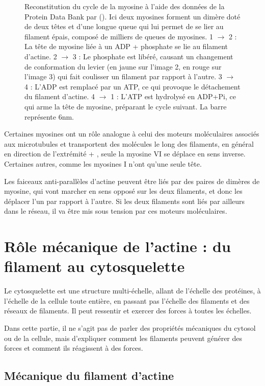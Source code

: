 \documentclass{report}
\begin{document}
\begin{figure}
\caption{Reconstitution du cycle de la myosine à l'aide des données de la Protein Data Bank par (\cite{vale_way_2000}). Ici deux myosines forment un dimère doté de deux têtes et d'une longue queue qui lui permet de se lier au filament épais, composé de milliers de queues de myosines.  1 $\rightarrow$ 2 : La tête de myosine liée à un ADP + phosphate se lie au filament d'actine. 2 $\rightarrow$ 3 : Le phosphate est libéré, causant un changement de conformation du levier (en jaune sur l'image 2, en rouge sur l'image 3) qui fait coulisser un filament par rapport à l'autre. 3 $\rightarrow$ 4 : L'ADP est remplacé par un ATP, ce qui provoque le détachement du filament d'actine. 4 $\rightarrow$ 1 : L'ATP est hydrolysé en ADP+Pi, ce qui arme la tête de myosine, préparant le cycle suivant. La barre représente 6nm. \label{myosin_cycle}}
\end{figure} 



Certaines myosines ont un rôle analogue à celui des moteurs moléculaires associés aux microtubules et transportent des molécules le long des filaments, en général en direction de l'extrémité + , seule la myosine VI se déplace en sens inverse. Certaines autres, comme les myosines I n'ont qu'une seule tête. 


Les faiceaux anti-parallèles d'actine peuvent être liés par des paires de dimères de myosine, qui vont marcher en sens opposé sur les deux filaments, et donc les déplacer l'un par rapport à l'autre. Si les deux filaments sont liés par ailleurs dans le réseau, il va être mis sous tension par ces moteurs moléculaires. 




\section{Rôle mécanique de l'actine : du filament au cytosquelette}

Le cytosquelette est une structure multi-échelle, allant de l'échelle des protéines, à l'échelle de la cellule toute entière, en passant pas l'échelle des filaments et des réseaux de filaments. Il peut ressentir et exercer des forces à toutes les échelles. 


Dans cette partie, il ne s'agit pas de parler des propriétés mécaniques du cytosol ou de la cellule, mais d'expliquer comment les filaments peuvent générer des forces et comment ils réagissent à des forces. 

\subsection{Mécanique du filament d'actine}
\end{document}
